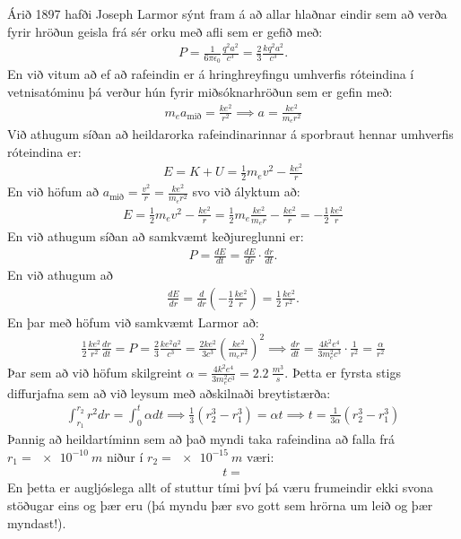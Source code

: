 \ifdefined \wholebook \else\documentclass[oneside]{book}\usepackage{EdlBook}\graphicspath{{figures/}}
\begin{document}
Árið 1897 hafði Joseph Larmor sýnt fram á að allar hlaðnar eindir sem að verða fyrir hröðun geisla frá sér orku með afli sem er gefið með:
\begin{align*}
    P = \frac{1}{6\pi \epsilon_0} \frac{q^2 a^2}{c^3} = \frac{2}{3} \frac{kq^2a^2}{c^3}.
\end{align*}
En við vitum að ef að rafeindin er á hringhreyfingu umhverfis róteindina í vetnisatóminu þá verður hún fyrir miðsóknarhröðun sem er gefin með:
\begin{align*}
    m_e a_{\text{mið}} = \frac{ke^2}{r^2} \implies a = \frac{ke^2}{m_e r^2}
\end{align*}
Við athugum síðan að heildarorka rafeindinarinnar á sporbraut hennar umhverfis róteindina er:
\begin{align*}
    E = K + U = \frac{1}{2}m_ev^2  - \frac{ke^2}{r}
\end{align*}
En við höfum að $a_{\text{mið}} = \frac{v^2}{r} = \frac{ke^2}{m_er^2}$ svo við ályktum að:
\begin{align*}
    E = \frac{1}{2}m_ev^2  - \frac{ke^2}{r} = \frac{1}{2} m_e \frac{ke^2}{m_e r} - \frac{ke^2}{r} = -\frac{1}{2} \frac{ke^2}{r}
\end{align*}
En við athugum síðan að samkvæmt keðjureglunni er:
\begin{align*}
    P = \frac{dE}{dt} = \frac{dE}{dr} \cdot \frac{dr}{dt}.
\end{align*}
En við athugum að
\begin{align*}
    \frac{dE}{dr} = \frac{d}{dr}\left( -\frac{1}{2}\frac{ke^2}{r} \right) = \frac{1}{2} \frac{ke^2}{r^2}.
\end{align*}
En þar með höfum við samkvæmt Larmor að:
\begin{align*}
    \frac{1}{2} \frac{ke^2}{r^2} \frac{dr}{dt} = P = \frac{2}{3} \frac{ke^2 a^2}{c^3} = \frac{2 k e^2}{3c^3} \left(  \frac{ke^2}{m_e r^2} \right)^2 \implies \frac{dr}{dt} = \frac{4k^2 e^4}{3m_e^2c^3} \cdot \frac{1}{r^2} = \frac{\alpha}{r^2}
\end{align*}
Þar sem að við höfum skilgreint $\alpha = \frac{4k^2e^4}{3m_e^2c^3} = \SI{2.2}{\frac{m^3}{s}}$. Þetta er fyrsta stigs diffurjafna sem að við leysum með aðskilnaði breytistærða:
\begin{align*}
    \int_{r_1}^{r_2} r^2 dr = \int_{0}^{t} \alpha dt \implies \frac{1}{3} \left(r_2^3 - r_1^3 \right) = \alpha t \implies t = \frac{1}{3\alpha} \left(r_2^3 - r_1^3 \right)
\end{align*}
Þannig að heildartíminn sem að það myndi taka rafeindina að falla frá $r_1 = \SI{e-10}{m}$ niður í $r_2 = \SI{e-15}{m}$ væri:
\begin{align*}
    t = 
\end{align*}
En þetta er augljóslega allt of stuttur tími því þá væru frumeindir ekki svona stöðugar eins og þær eru (þá myndu þær svo gott sem hrörna um leið og þær myndast!). 
\end{document}
